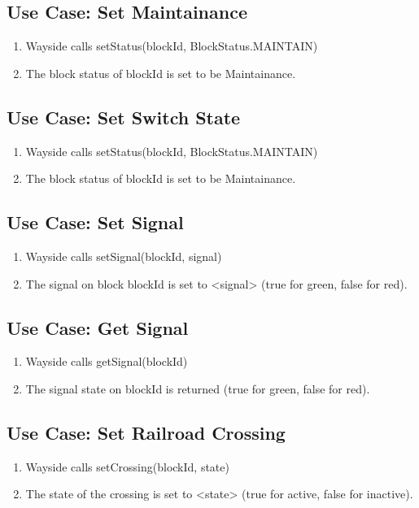 \documentclass{scrreprt}
\begin{document}
\subsection{Use Case: Set Maintainance}
\begin{enumerate}
	\item Wayside calls setStatus(blockId, BlockStatus.MAINTAIN)
	\item The block status of blockId is set to be Maintainance.
\end{enumerate}

\subsection{Use Case: Set Switch State}
\begin{enumerate}
	\item Wayside calls setStatus(blockId, BlockStatus.MAINTAIN)
	\item The block status of blockId is set to be Maintainance.
\end{enumerate}

\subsection{Use Case: Set Signal}
\begin{enumerate}
	\item Wayside calls setSignal(blockId, signal)
	\item The signal on block blockId is set to <signal> (true for green, false for red).
\end{enumerate}

\subsection{Use Case: Get Signal}
\begin{enumerate}
	\item Wayside calls getSignal(blockId)
	\item The signal state on blockId is returned (true for green, false for red).
\end{enumerate}

\subsection{Use Case: Set Railroad Crossing}
\begin{enumerate}
	\item Wayside calls setCrossing(blockId, state)
	\item The state of the crossing is set to <state> (true for active, false for inactive).
\end{enumerate}
\end{document}
